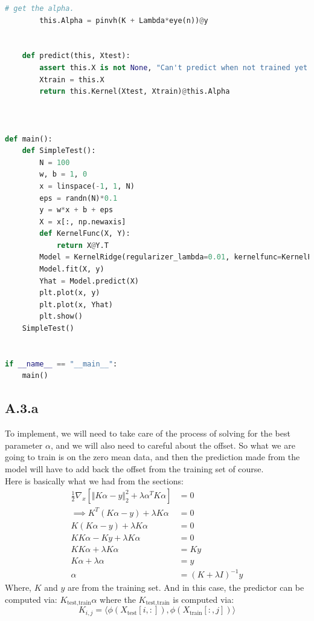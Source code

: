 \documentclass[]{article}
\begin{document}
\begin{lstlisting}[language=python]
        # get the alpha.
        this.Alpha = pinvh(K + Lambda*eye(n))@y


    def predict(this, Xtest):
        assert this.X is not None, "Can't predict when not trained yet. "
        Xtrain = this.X
        return this.Kernel(Xtest, Xtrain)@this.Alpha



def main():
    def SimpleTest():
        N = 100
        w, b = 1, 0
        x = linspace(-1, 1, N)
        eps = randn(N)*0.1
        y = w*x + b + eps
        X = x[:, np.newaxis]
        def KernelFunc(X, Y):
            return X@Y.T
        Model = KernelRidge(regularizer_lambda=0.01, kernelfunc=KernelFunc)
        Model.fit(X, y)
        Yhat = Model.predict(X)
        plt.plot(x, y)
        plt.plot(x, Yhat)
        plt.show()
    SimpleTest()


if __name__ == "__main__":
    main()
    \end{lstlisting}
    \subsection*{A.3.a}
        To implement, we will need to take care of the process of solving for the best parameter $\alpha$, and we will also need to careful about the offset. So what we are going to train is on the zero mean data, and then the prediction made from the model will have to add back the offset from the training set of course. 
        \\
        Here is basically what we had from the sections: 
        \begin{align*}\tag{A.3.a}\label{eqn:A.3.a}
            \frac{1}{2}\nabla_x[\Vert K\alpha - y\Vert_2^2 + \lambda \alpha^T K \alpha] &= 0
            \\
            \implies K^T(K\alpha - y) + \lambda K\alpha &= 0
            \\
            K(K\alpha - y) + \lambda K\alpha &= 0
            \\
            KK\alpha - Ky + \lambda K\alpha &= 0
            \\
            KK\alpha + \lambda K\alpha &= Ky
            \\
            K \alpha + \lambda \alpha &= y
            \\
            \alpha &= (K + \lambda I)^{-1}y
        \end{align*}
        Where, $K$ and $y$ are from the training set. And in this case, the predictor can be computed via: $K_{\text{test}, \text{train}}\alpha$ where the $K_{\text{test}, \text{train}}$ is computed via: 
        $$
            K_{i, j} = \langle \phi(X_{\text{test}}[i, :]), 
                                \phi(X_{\text{train}}[:, j]) 
            \rangle
        $$
        
\end{document}
